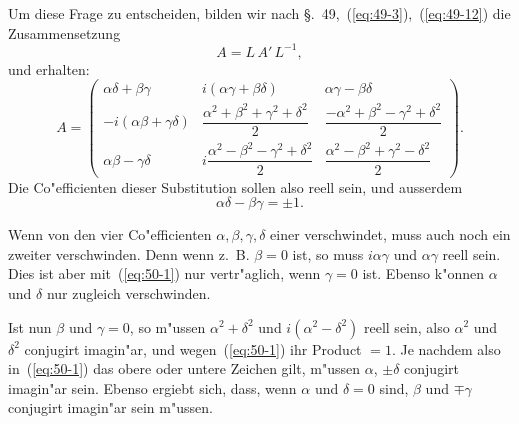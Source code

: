 \documentclass[12pt,a4paper]{article}
\theoremstyle{definition}
\begin{document}
Um diese Frage zu entscheiden, bilden wir nach \S.~49,~(\ref{eq:49-3}),~(\ref{eq:49-12}) die Zusammensetzung
\[
A = L\,A'\,L^{-1},
\]
und erhalten:
\[
A = \begin{pmatrix}
\alpha\delta + \beta\gamma & i(\alpha\gamma + \beta\delta) & \alpha\gamma - \beta\delta \\[4pt]
-i(\alpha\beta + \gamma\delta) & \dfrac{\alpha^2 + \beta^2 + \gamma^2 + \delta^2}{2} & \dfrac{-\alpha^2 + \beta^2 - \gamma^2 + \delta^2}{2} \\[8pt]
\alpha\beta - \gamma\delta & i\dfrac{\alpha^2 - \beta^2 - \gamma^2 + \delta^2}{2} & \dfrac{\alpha^2 - \beta^2 + \gamma^2 - \delta^2}{2}
\end{pmatrix}.
\]
Die Co"efficienten dieser Substitution sollen also reell sein, und ausserdem
\begin{equation}\label{eq:50-1}
\alpha\delta - \beta\gamma = \pm 1.
\end{equation}

Wenn von den vier Co"efficienten $\alpha, \beta, \gamma, \delta$ einer verschwindet, muss auch noch ein zweiter verschwinden. Denn wenn z.~B. $\beta = 0$ ist, so muss $i\alpha\gamma$ und $\alpha\gamma$ reell sein. Dies ist aber mit~(\ref{eq:50-1}) nur vertr"aglich, wenn $\gamma = 0$ ist. Ebenso k"onnen $\alpha$ und $\delta$ nur zugleich verschwinden.

Ist nun $\beta$ und $\gamma = 0$, so m"ussen $\alpha^2 + \delta^2$ und $i(\alpha^2 - \delta^2)$ reell sein, also $\alpha^2$ und $\delta^2$ conjugirt imagin"ar, und wegen~(\ref{eq:50-1}) ihr Product $= 1$. Je nachdem also in~(\ref{eq:50-1}) das obere oder untere Zeichen gilt, m"ussen $\alpha$, $\pm\delta$ conjugirt imagin"ar sein. Ebenso ergiebt sich, dass, wenn $\alpha$ und $\delta = 0$ sind, $\beta$ und $\mp\gamma$ conjugirt imagin"ar sein m"ussen.
\end{document}
